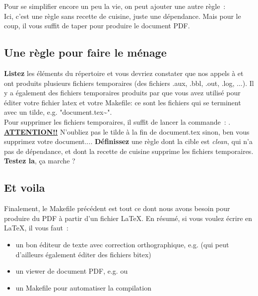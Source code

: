 Pour se simplifier encore un peu la vie, on peut ajouter une autre règle~:\\
\cprotect{}
Ici, c'est une règle sans recette de cuisine, juste une dépendance. Mais pour le coup, il vous suffit de taper  pour produire le document PDF.

\subsection{Une règle pour faire le ménage}

\textbf{Listez} les éléments du répertoire et vous devriez constater que nos appels à \pdflatex et \bibtex ont produits plusieurs fichiers temporaires (des fichiers .aux, .bbl, .out, .log, ...). Il y a également des fichiers temporaires produits par \emacs que vous avez utilisé pour éditer votre fichier latex et votre Makefile: ce sont les fichiers qui se terminent avec un tilde, e.g.  "document.tex\textasciitilde".\\

Pour supprimer les fichiers temporaires, il suffit de lancer la commande~: . \underline{\textbf{ATTENTION!!}} N'oubliez pas le tilde à la fin de document.tex sinon, ben vous supprimez votre document.... \textbf{Définissez} une règle dont la cible est \emph{clean}, qui n'a pas de dépendance, et dont la recette de cuisine supprime les fichiers temporaires. \textbf{Testez la}, ça marche ?\\

\subsection{Et voila}

Finalement, le Makefile précédent est tout ce dont nous avons besoin pour produire du PDF à partir d'un fichier \LaTeX. En résumé, si vous voulez écrire en \LaTeX, il vous faut~:
\begin{itemize}
\item un bon éditeur de texte avec correction orthographique, e.g. \emacs (qui peut d'ailleurs également éditer des fichiers bitex)
\item un viewer de document PDF, e.g. \evince ou \okular
\item un Makefile pour automatiser la compilation
\end{itemize}

